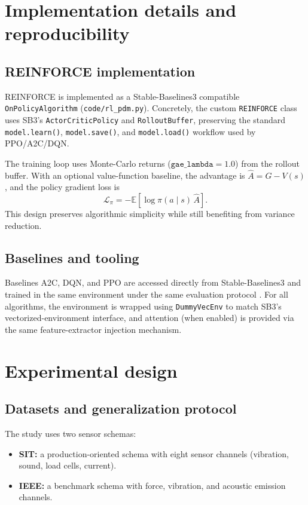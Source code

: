 \documentclass[11pt]{article}
\begin{document}
\section{Implementation details and reproducibility}
\label{sec:implementation}
\subsection{REINFORCE implementation}
\label{sec:reinforce_impl}
REINFORCE is implemented as a Stable-Baselines3 compatible \texttt{OnPolicyAlgorithm} (\texttt{code/rl\_pdm.py}). Concretely, the custom \texttt{REINFORCE} class uses SB3's \texttt{ActorCriticPolicy} and \texttt{RolloutBuffer}, preserving the standard \texttt{model.learn()}, \texttt{model.save()}, and \texttt{model.load()} workflow used by PPO/A2C/DQN.

The training loop uses Monte-Carlo returns ($\texttt{gae\_lambda}=1.0$) from the rollout buffer. With an optional value-function baseline, the advantage is $\hat{A}=G-V(s)$, and the policy gradient loss is
\begin{equation}
	\mathcal{L}_{\pi} = -\mathbb{E}[\log\pi(a\mid s)\,\hat{A}].
\end{equation}
This design preserves algorithmic simplicity while still benefiting from variance reduction.

\subsection{Baselines and tooling}
Baselines A2C, DQN, and PPO are accessed directly from Stable-Baselines3 and trained in the same environment under the same evaluation protocol \parencite{StableBaselines3}. For all algorithms, the environment is wrapped using \texttt{DummyVecEnv} to match SB3's vectorized-environment interface, and attention (when enabled) is provided via the same feature-extractor injection mechanism.

\section{Experimental design}
\label{sec:experiment}
\subsection{Datasets and generalization protocol}
The study uses two sensor schemas:
\begin{itemize}
	\item \textbf{SIT:} a production-oriented schema with eight sensor channels (vibration, sound, load cells, current).
	\item \textbf{IEEE:} a benchmark schema with force, vibration, and acoustic emission channels.
\end{itemize}
\end{document}
